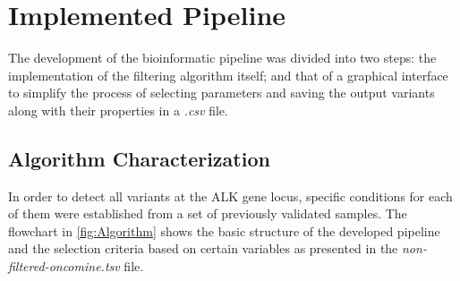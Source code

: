 
\section{Implemented Pipeline}

The development of the bioinformatic pipeline was divided into two steps: the implementation of the filtering algorithm itself; and that of a graphical interface to simplify the process of selecting parameters and saving the output variants along with their properties in a \textit{.csv} file.

\subsection{Algorithm Characterization}

In order to detect all variants at the ALK gene locus, specific conditions for each of them were established from a set of previously validated samples. The flowchart in \autoref{fig:Algorithm} shows the basic structure of the developed pipeline and the selection criteria based on certain variables as presented in the \textit{non-filtered-oncomine.tsv} file.


